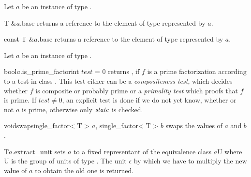 
\ACCS

Let $a$ be an instance of type .

\begin{fcode}{T &}{$a$.base}{}
  returns a reference to the element of type  represented by $a$.
\end{fcode}

\begin{cfcode}{const T &}{$a$.base}{}
  returns a reference to the element of type  represented by $a$.
\end{cfcode}



\HIGH

Let $a$ be an instance of type .



\begin{fcode}{bool}{$a$.is_prime_factor}{int $\mathit{test}$ = 0}
  returns \TRUE, if $f$ is a prime factorization according to a test in class
  .  This test either can be a \emph{compositeness test}, which decides
  whether $f$ is composite or probably prime or a \emph{primality test} which proofs that $f$ is
  prime.  If $\mathit{test} \neq 0$, an explicit test is done if we do not yet know, whether or
  not $a$ is prime, otherwise only $\mathit{state}$ is checked.
\end{fcode}





\begin{fcode}{void}{swap}{single_factor< T > $a$, single_factor< T > $b$}
  swaps the values of $a$ and $b$.
\end{fcode}

\begin{fcode}{T}{$a$.extract_unit}{}
  sets $a$ to a fixed representant of the equivalence class $a$U where U is the group of units
  of type .  The unit $\epsilon$ by which we have to multiply the new value of $a$ to
  obtain the old one is returned.
\end{fcode}

